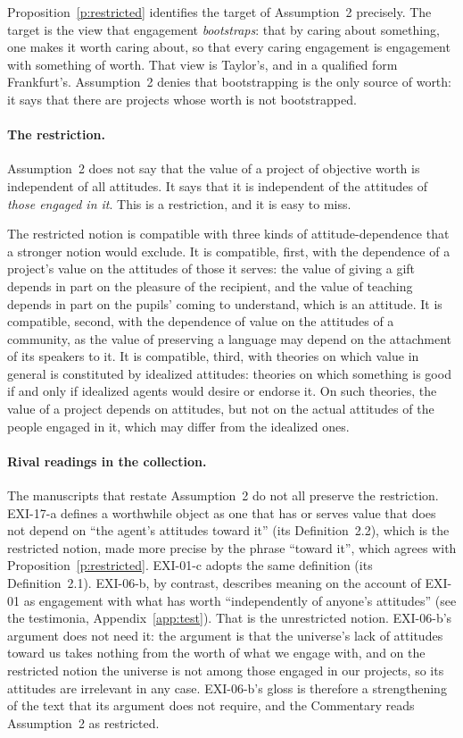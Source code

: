 Proposition~\ref{p:restricted} identifies the target of Assumption~2 precisely. The target is the view that engagement \emph{bootstraps}: that by caring about something, one makes it worth caring about, so that every caring engagement is engagement with something of worth. That view is Taylor's, and in a qualified form Frankfurt's. Assumption~2 denies that bootstrapping is the only source of worth: it says that there are projects whose worth is not bootstrapped.


\paragraph{The restriction.} Assumption~2 does not say that the value of a project of objective worth is independent of all attitudes. It says that it is independent of the attitudes of \emph{those engaged in it}. This is a restriction, and it is easy to miss.

The restricted notion is compatible with three kinds of attitude-dependence that a stronger notion would exclude. It is compatible, first, with the dependence of a project's value on the attitudes of those it serves: the value of giving a gift depends in part on the pleasure of the recipient, and the value of teaching depends in part on the pupils' coming to understand, which is an attitude. It is compatible, second, with the dependence of value on the attitudes of a community, as the value of preserving a language may depend on the attachment of its speakers to it. It is compatible, third, with theories on which value in general is constituted by idealized attitudes: theories on which something is good if and only if idealized agents would desire or endorse it. On such theories, the value of a project depends on attitudes, but not on the actual attitudes of the people engaged in it, which may differ from the idealized ones.

\paragraph{Rival readings in the collection.} The manuscripts that restate Assumption~2 do not all preserve the restriction. EXI-17-a defines a worthwhile object as one that has or serves value that does not depend on \enquote{the agent's attitudes toward it} (its Definition~2.2), which is the restricted notion, made more precise by the phrase \enquote{toward it}, which agrees with Proposition~\ref{p:restricted}. EXI-01-c adopts the same definition (its Definition~2.1). EXI-06-b, by contrast, describes meaning on the account of EXI-01 as engagement with what has worth \enquote{independently of anyone's attitudes} (see the testimonia, Appendix~\ref{app:test}). That is the unrestricted notion. EXI-06-b's argument does not need it: the argument is that the universe's lack of attitudes toward us takes nothing from the worth of what we engage with, and on the restricted notion the universe is not among those engaged in our projects, so its attitudes are irrelevant in any case. EXI-06-b's gloss is therefore a strengthening of the text that its argument does not require, and the Commentary reads Assumption~2 as restricted.

